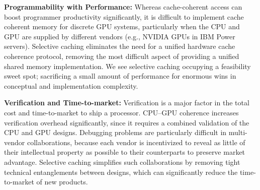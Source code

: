 \textbf{Programmability with Performance:} Whereas cache-coherent access
can boost programmer productivity significantly, it is difficult to implement
cache coherent memory for discrete GPU systems, particularly when the CPU and
GPU are supplied by different vendors (e.g., NVIDIA GPUs in IBM Power servers).
%
Selective caching eliminates the need for a unified hardware cache
coherence protocol, removing the most difficult aspect of providing a unified
shared memory implementation. We see selective caching occupying a feasibility
sweet spot; sacrificing a small amount of performance for enormous wins in
conceptual and implementation complexity.

\textbf{Verification and Time-to-market:} Verification is a major factor in the total
cost and time-to-market to ship a processor. CPU--GPU coherence increases
verification overhead significantly, since it requires a combined validation of
the CPU and GPU designs. Debugging problems are particularly difficult in
multi-vendor collaborations, because each vendor is incentivized to reveal as
little of their intellectual property as possible to their counterparts to
preserve market advantage. Selective caching simplifies such collaborations by
removing tight technical entanglements between designs, which can significantly
reduce the time-to-market of new products.

